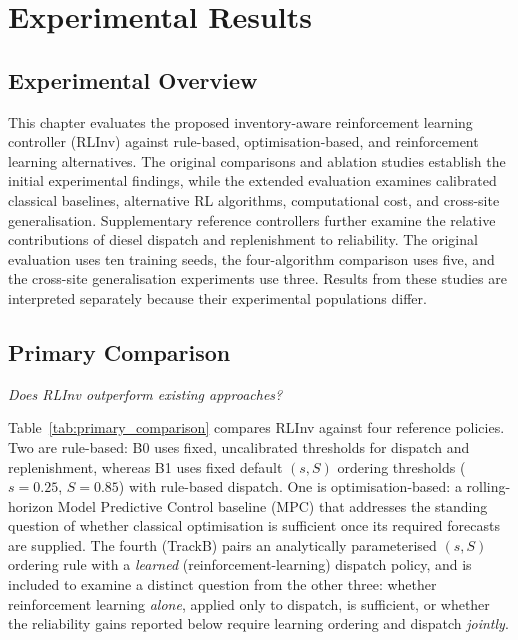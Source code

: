 \chapter{Experimental Results}
\label{chap:results}
\setlength{\emergencystretch}{3em}

\section{Experimental Overview}
\label{sec:results_overview}


\begin{revisedblock}
This chapter evaluates the proposed inventory-aware
reinforcement learning controller (RLInv) against
rule-based, optimisation-based, and reinforcement learning
alternatives. The original comparisons and ablation
studies establish the initial experimental findings,
while the extended evaluation examines calibrated
classical baselines, alternative RL algorithms,
computational cost, and cross-site generalisation.
Supplementary reference controllers further examine
the relative contributions of diesel dispatch and
replenishment to reliability. The original evaluation
uses ten training seeds, the four-algorithm comparison
uses five, and the cross-site generalisation experiments
use three. Results from these studies are interpreted
separately because their experimental populations differ.
\end{revisedblock}


\section{Primary Comparison}
\label{sec:primary_comparison}

\emph{Does RLInv outperform existing approaches?}

Table~\ref{tab:primary_comparison} compares RLInv against four
reference policies. Two are rule-based: B0 uses fixed, uncalibrated
thresholds for dispatch and replenishment, whereas
B1 uses fixed default $(s,S)$ ordering thresholds
($s=0.25$, $S=0.85$) with rule-based dispatch. One is optimisation-based: a rolling-horizon
Model Predictive Control baseline (MPC) that addresses the standing
question of whether classical optimisation is sufficient once its
required forecasts are supplied. The fourth (TrackB) pairs an analytically
parameterised $(s,S)$ ordering rule with a
\emph{learned} (reinforcement-learning)
dispatch policy, and is included to examine a distinct question from
the other three: whether reinforcement learning \emph{alone}, applied
only to dispatch, is sufficient, or whether the reliability gains
reported below require learning ordering and dispatch \emph{jointly}.

